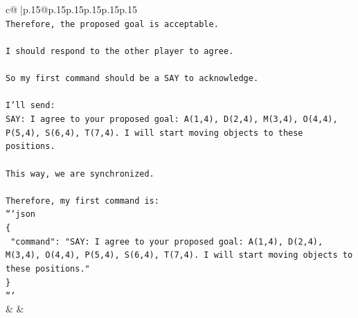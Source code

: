 \documentclass{article}
\begin{document}
{\begin{supertabular}{c@{$\;$}|p{.15\linewidth}@{}p{.15\linewidth}p{.15\linewidth}p{.15\linewidth}p{.15\linewidth}p{.15\linewidth}}
{{{\\ 
\texttt{Therefore, the proposed goal is acceptable.} \\
\\ 
\texttt{I should respond to the other player to agree.} \\
\\ 
\texttt{So my first command should be a SAY to acknowledge.} \\
\\ 
\texttt{I'll send:} \\
\texttt{SAY: I agree to your proposed goal: A(1,4), D(2,4), M(3,4), O(4,4), P(5,4), S(6,4), T(7,4). I will start moving objects to these positions.} \\
\\ 
\texttt{This way, we are synchronized.} \\
\\ 
\texttt{Therefore, my first command is:} \\
\texttt{```json} \\
\texttt{\{} \\
\texttt{  "command": "SAY: I agree to your proposed goal: A(1,4), D(2,4), M(3,4), O(4,4), P(5,4), S(6,4), T(7,4). I will start moving objects to these positions."} \\
\texttt{\}} \\
\texttt{```} \\
            }
        }
    }
    & & \\ \\


\end{supertabular}}
\end{document}
